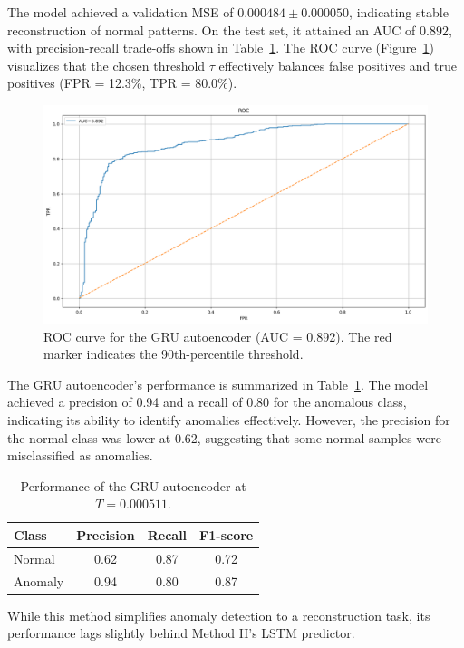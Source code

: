 \documentclass[ngerman]{scrartcl}
\begin{document}
\noindent The model achieved a validation MSE of \(0.000484 \pm 0.000050\), indicating stable reconstruction of normal patterns. On the test set, it attained an AUC of \(0.892\), with precision-recall trade-offs shown in Table~\ref{tab:gru_results}. The ROC curve (Figure~\ref{fig:rocGRU}) visualizes that the chosen threshold \(\tau\) effectively balances false positives and true positives (FPR = 12.3\%, TPR = 80.0\%).
\begin{figure}[h]
    \centering
    \includegraphics[width=\textwidth]{./Figures/ROC_Autoenc.png}
    \caption{ROC curve for the GRU autoencoder (AUC = 0.892). The red marker indicates the 90th-percentile threshold.}
    \label{fig:rocGRU}
\end{figure}
\noindent The GRU autoencoder's performance is summarized in Table~\ref{tab:gru_results}. The model achieved a precision of 0.94 and a recall of 0.80 for the anomalous class, indicating its ability to identify anomalies effectively. However, the precision for the normal class was lower at 0.62, suggesting that some normal samples were misclassified as anomalies.
\begin{table}[H]
    \centering
    \begin{tabular}{lccc}
        \toprule
        Class & Precision & Recall & F1-score \\
        \midrule
        Normal & 0.62 & 0.87 & 0.72 \\
        Anomaly & 0.94 & 0.80 & 0.87 \\
        \bottomrule
    \end{tabular}
    \caption{Performance of the GRU autoencoder at \(T = 0.000511\).}
    \label{tab:gru_results}
\end{table}
\noindent While this method simplifies anomaly detection to a reconstruction task, its performance lags slightly behind Method II's LSTM predictor.%
\end{document}
